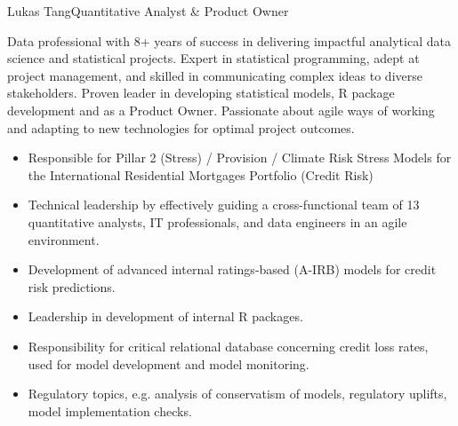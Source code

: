 \documentclass{article}
\begin{document}
\begin{cv}[avatar]{Lukas Tang}{Quantitative Analyst \& Product Owner}



Data professional with 8+ years of success in delivering impactful analytical data science and statistical projects. Expert in statistical programming, adept at project management, and skilled in communicating complex ideas to diverse stakeholders. Proven leader in developing statistical models, R package development and as a Product Owner. Passionate about agile ways of working and adapting to new technologies for optimal project outcomes.


\begin{cvevent}[09/2023][present]
    \begin{itemize}
        \item Responsible for Pillar 2 (Stress) / Provision / Climate Risk Stress Models for the International Residential Mortgages Portfolio (Credit Risk)
        \item Technical leadership by effectively guiding a cross-functional team of 13 quantitative analysts, IT professionals, and data engineers in an agile environment.         
    \end{itemize}
\end{cvevent}

\begin{cvevent}[03/2021][08/2023]
    \begin{itemize}
        \item Development of advanced internal ratings-based (A-IRB) models for credit risk predictions.
        \item Leadership in development of internal R packages.
        \item Responsibility for critical relational database concerning credit loss rates, used for model development and model monitoring.
        \item Regulatory topics, e.g. analysis of conservatism of models, regulatory uplifts, model implementation checks.
    \end{itemize}
\end{cvevent}


\end{cv}
\end{document}
